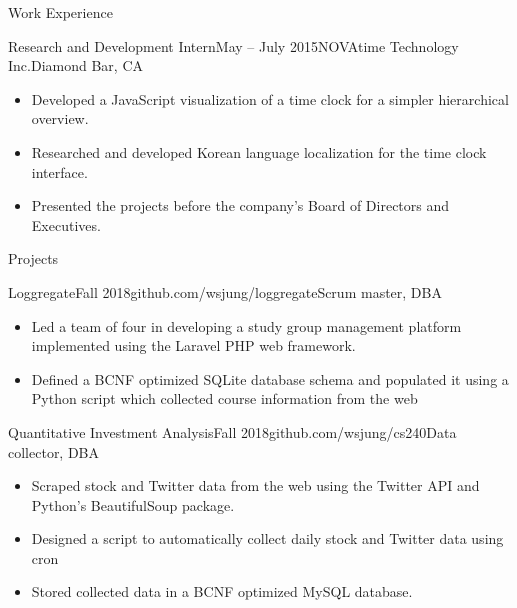 \documentclass{resume} %
\begin{document}
\begin{rSection}{Work Experience}
\begin{rSubsection}{Research and Development Intern}{May -- July 2015}{NOVAtime Technology Inc.}{Diamond Bar, CA}
\renewcommand\labelitemi{$\cdot$}
\begin{itemize}
\setlength\itemsep{-0.25em}
\item Developed a JavaScript visualization of a time clock for a simpler hierarchical overview. 
\item Researched and developed Korean language localization for the time clock interface.
\item Presented the projects before the company's Board of Directors and Executives.\end{itemize}
\end{rSubsection}

\end{rSection}

\begin{rSection}{Projects}

\begin{rSubsection}{Loggregate}{Fall 2018}{github.com/wsjung/loggregate}{Scrum master, DBA}
\renewcommand\labelitemi{$\cdot$}
\begin{itemize}
\setlength\itemsep{-0.25em}
\item Led a team of four in developing a study group management platform implemented using the Laravel PHP web framework.
\item Defined a BCNF optimized SQLite database schema and populated it using a Python script which collected course information from the web
\end{itemize}
\end{rSubsection}

\begin{rSubsection}{Quantitative Investment Analysis}{Fall 2018}{github.com/wsjung/cs240}{Data collector, DBA}
\renewcommand\labelitemi{$\cdot$}
\begin{itemize}
\setlength\itemsep{-0.25em}
\item Scraped stock and Twitter data from the web using the Twitter API and Python's BeautifulSoup package.
\item Designed a script to automatically collect daily stock and Twitter data using cron
\item Stored collected data in a BCNF optimized MySQL database.
\end{itemize}
\end{rSubsection}

\end{rSection}
\end{document}
